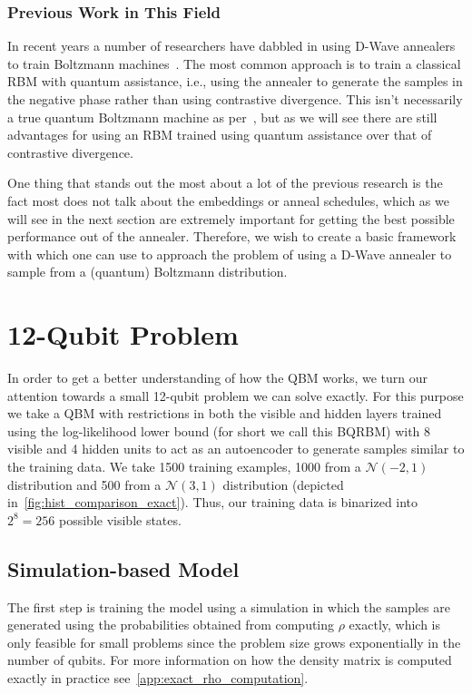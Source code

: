 \subsubsection{Previous Work in This Field}
In recent years a number of researchers have dabbled in using D-Wave annealers to train Boltzmann machines~\cite{adachi_2015,benedetti_2016,anschuetz_2019,wiebe_2019,rocutto_2020,dixit_2021,ilmo_2021,wilson_2021}.
The most common approach is to train a classical RBM with quantum assistance, i.e., using the annealer to generate the samples in the negative phase rather than using contrastive divergence.
This isn't necessarily a true quantum Boltzmann machine as per~\cite{amin_2018}, but as we will see there are still advantages for using an RBM trained using quantum assistance over that of contrastive divergence.

One thing that stands out the most about a lot of the previous research is the fact most does not talk about the embeddings or anneal schedules, which as we will see in the next section are extremely important for getting the best possible performance out of the annealer.
Therefore, we wish to create a basic framework with which one can use to approach the problem of using a D-Wave annealer to sample from a (quantum) Boltzmann distribution.

\section{12-Qubit Problem}
In order to get a better understanding of how the QBM works, we turn our attention towards a small 12-qubit problem we can solve exactly.
For this purpose we take a QBM with restrictions in both the visible and hidden layers trained using the log-likelihood lower bound (for short we call this BQRBM) with 8 visible and 4 hidden units to act as an autoencoder to generate samples similar to the training data.
We take 1500 training examples, 1000 from a \( \mathcal{N}(-2, 1) \) distribution and 500 from a \( \mathcal{N}(3, 1) \) distribution (depicted in~\cref{fig:hist_comparison_exact}).
Thus, our training data is binarized into \( 2^8 = 256 \) possible visible states.

\subsection{Simulation-based Model}
The first step is training the model using a simulation in which the samples are generated using the probabilities obtained from computing \( \rho \) exactly, which is only feasible for small problems since the problem size grows exponentially in the number of qubits.
For more information on how the density matrix is computed exactly in practice see~\cref{app:exact_rho_computation}.

